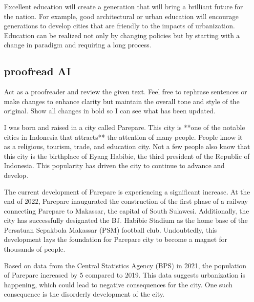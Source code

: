 \documentclass[../main.tex]{subfiles}
\begin{document}
Excellent education will create a generation that will bring a brilliant future for the nation. For example, good architectural or urban education will encourage generations to develop cities that are friendly to the impacts of urbanization. Education can be realized not only by changing policies but by starting with a change in paradigm and requiring a long process.

\subsection{proofread AI}%
\label{sub:proofread AI}

Act as a proofreader and review the given text. Feel free to rephrase sentences or make changes to enhance clarity but maintain the overall tone and style of the original. Show all changes in bold so I can see what has been updated.

I was born and raised in a city called Parepare. This city is **one of the notable cities in Indonesia that attracts** the attention of many people. People know it as a religious, tourism, trade, and education city. Not a few people also know that this city is the birthplace of Eyang Habibie, the third president of the Republic of Indonesia. This popularity has driven the city to continue to advance and develop.

The current development of Parepare is experiencing a significant increase. At the end of 2022, Parepare inaugurated the construction of the first phase of a railway connecting Parepare to Makassar, the capital of South Sulawesi. Additionally, the city has successfully designated the BJ. Habibie Stadium as the home base of the Persatuan Sepakbola Makassar (PSM) football club. Undoubtedly, this development lays the foundation for Parepare city to become a magnet for thousands of people.

Based on data from the Central Statistics Agency (BPS) in 2021, the population of Parepare increased by 5 compared to 2019. This data suggests urbanization is happening, which could lead to negative consequences for the city. One such consequence is the disorderly development of the city.
\end{document}

